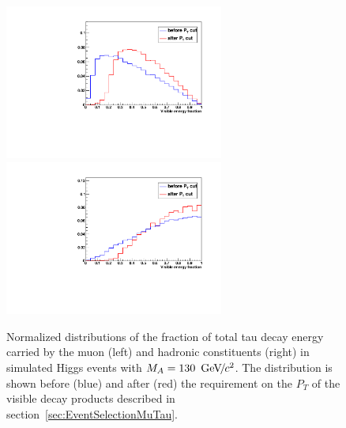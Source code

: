 \begin{figure}[t]
\begin{center}
\includegraphics*[width=72mm]{svfit_chapter/figures/scuplting_A130_muon.pdf}
\includegraphics*[width=72mm]{svfit_chapter/figures/scuplting_A130_tau.pdf}
\caption{\captiontext Normalized distributions of the fraction of total tau
decay energy carried by the muon (left) and hadronic constituents (right) in
simulated Higgs events with \mbox{$M_{A} = 130~{\,\text{Ge\hspace{-.08em}V\hspace{-0.16em}/\hspace{-0.08em}}c^\text{2}}$}.  The distribution is shown
before (blue) and after (red) the requirement on the $P_T$ of the visible decay
products described in section~\ref{sec:EventSelectionMuTau}.  }
\label{fig:ptBalancePtVisCuts}
\end{center}
\end{figure} 

